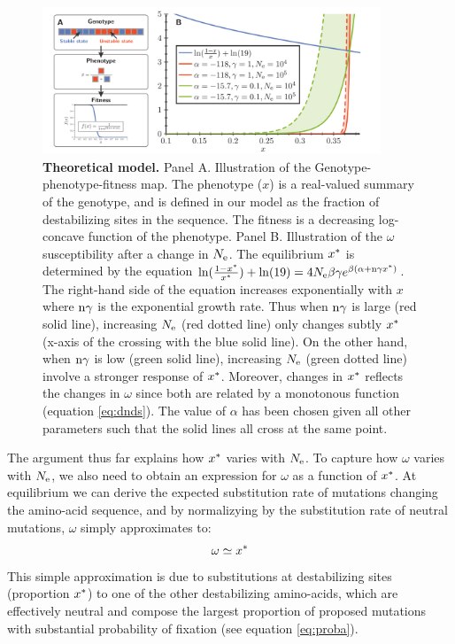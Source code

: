 \documentclass{article}
\begin{document}
	\begin{figure}[htb!]
		\begin{mdframed}
			\centering
			\includegraphics[width=0.9\textwidth, page=1] {artworks/theoretical.pdf}
			\caption{
				\textbf{Theoretical model.}
				Panel A. Illustration of the Genotype-phenotype-fitness map. The phenotype ($x$) is a real-valued summary of the genotype, and is defined in our model as the fraction of destabilizing sites in the sequence. The fitness is a decreasing log-concave function of the phenotype.
				Panel B. Illustration of the $\omega$ susceptibility after a change in $N_{\mathrm{e}}$. The equilibrium $x^{*}$ is determined by the equation $\ln(\frac{1 - x^{*}}{x^{*}}) + \ln(19)=4N_{\mathrm{e}} \beta \gamma e^{\beta (\alpha + \text{n} \gamma x^{*})}$. The right-hand side of the equation increases exponentially with $x$ where $\text{n} \gamma$ is the exponential growth rate. Thus when $\text{n} \gamma$ is large (red solid line), increasing $N_{\mathrm{e}}$ (red dotted line) only changes subtly $x^{*}$ (x-axis of the crossing with the blue solid line). On the other hand, when $\text{n} \gamma$ is low (green solid line), increasing $N_{\mathrm{e}}$ (green dotted line) involve a stronger response of $x^{*}$. Moreover, changes in $x^{*}$ reflects the changes in $\omega$ since both are related by a monotonous function (equation \ref{eq:dnds}). The value of $\alpha$ has been chosen given all other parameters such that the solid lines all cross at the same point.
			}
			\label{fig:NeChangeInfluence}
		\end{mdframed}
	\end{figure}
	
	The argument thus far explains how $x^{*}$ varies with $N_{\mathrm{e}}$.
	To capture how $\omega$ varies with $N_{\mathrm{e}}$, we also need to obtain an expression for $\omega$ as a function of $x^{*}$. 
	At equilibrium we can derive the expected substitution rate of mutations changing the amino-acid sequence, and by normalizying by the substitution rate of neutral mutations, $\omega$ simply approximates to:
	\begin{gather}
		\omega \simeq x^{*} \label{eq:dnds}
	\end{gather}
	This simple approximation is due to substitutions at destabilizing sites (proportion $x^{*}$) to one of the other destabilizing amino-acids, which are effectively neutral and compose the largest proportion of proposed mutations with substantial probability of fixation (see equation \ref{eq:proba}).
	
\end{document}
